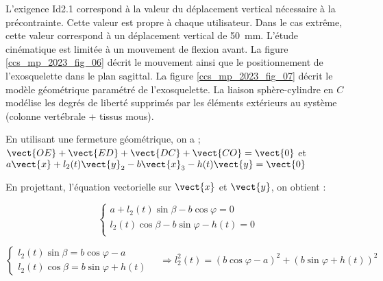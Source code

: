 \ifprof
\else

L'exigence Id2.1 correspond à la valeur du déplacement vertical nécessaire à la précontrainte. Cette valeur est propre à chaque utilisateur. Dans le cas extrême, cette valeur correspond à un déplacement vertical de \SI{50}{mm}. L'étude cinématique est limitée à un mouvement de flexion avant. La figure \ref{ccs_mp_2023_fig_06} décrit le mouvement ainsi que le positionnement de l'exosquelette dans le plan sagittal. La figure \ref{ccs_mp_2023_fig_07} décrit le modèle géométrique paramétré de l'exosquelette. La liaison sphère-cylindre en $C$ modélise les degrés de liberté supprimés par les éléments extérieurs au système (colonne vertébrale + tissus mous).\\
\fi

\ifprof
\begin{corrige}
En utilisant une fermeture géométrique, on a ; 
$ \vect{OE} + \vect{ED} + \vect{DC} + \vect{CO} = \vect{0} $ et 
$a \vect{x} + l_2(t) \vect{y}_2 - b\vect{x}_3 - h(t) \vect{y} = \vect{0} $

En projettant, l'équation vectorielle sur $\vect{x}$ et $\vect{y}$, on obtient :

$$
\left\{
\begin{array}{l}
a  + l_2(t) \sin\beta - b\cos\varphi = 0  \\
 l_2(t) \cos\beta - b\sin\varphi - h(t)  = 0  \\
\end{array}
\right.
$$


$$
\left\{
\begin{array}{l}
l_2(t) \sin\beta  = b\cos\varphi -a   \\
 l_2(t) \cos\beta =   b\sin\varphi + h(t) 
\end{array}
\right.
\quad
\Rightarrow
l_2^2(t) = \left(b\cos\varphi -a  \right)^2  + \left(b\sin\varphi + h(t) \right)^2 
$$

\end{corrige}
\else
\fi

\ifprof
\else



